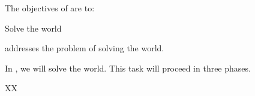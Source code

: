 \addtocounter{wpno}{1}
\begin{Workpackage}{\thewpno}
\WPTitle{\wpname{\thewpno}}

\begin{WPObjectives}
The objectives of \theWP{} are to:
\begin{compactitem}
\item Solve the world
\end{compactitem}
\end{WPObjectives}

\begin{WPDescription}
\theWP{} addresses the problem of solving the world.
\end{WPDescription}

\begin{Task}

\TaskResults{%
}
\TaskHeader{}

In \theTask, we will solve the world. 
This task will proceed in three phases. 
\end{Task}



\begin{WPDeliverables}
  \begin{compactitem}
    \item XX
\end{compactitem}
\end{WPDeliverables}
\end{Workpackage}

